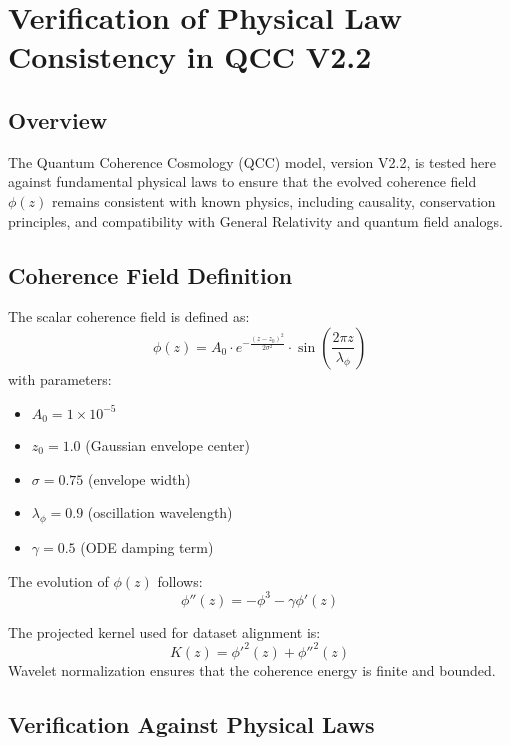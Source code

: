 
\section{Verification of Physical Law Consistency in QCC V2.2}

\subsection{Overview}

The Quantum Coherence Cosmology (QCC) model, version V2.2, is tested here against fundamental physical laws to ensure that the evolved coherence field $\phi(z)$ remains consistent with known physics, including causality, conservation principles, and compatibility with General Relativity and quantum field analogs.

\subsection{Coherence Field Definition}

The scalar coherence field is defined as:
\begin{equation}
\phi(z) = A_0 \cdot e^{-\frac{(z - z_0)^2}{2\sigma^2}} \cdot \sin\left(\frac{2\pi z}{\lambda_\phi}\right)
\end{equation}
with parameters:
\begin{itemize}
  \item $A_0 = 1 \times 10^{-5}$
  \item $z_0 = 1.0$ (Gaussian envelope center)
  \item $\sigma = 0.75$ (envelope width)
  \item $\lambda_\phi = 0.9$ (oscillation wavelength)
  \item $\gamma = 0.5$ (ODE damping term)
\end{itemize}

The evolution of $\phi(z)$ follows:
\begin{equation}
\phi''(z) = -\phi^3 - \gamma \phi'(z)
\end{equation}

The projected kernel used for dataset alignment is:
\begin{equation}
K(z) = \phi'^2(z) + \phi''^2(z)
\end{equation}
Wavelet normalization ensures that the coherence energy is finite and bounded.

\subsection{Verification Against Physical Laws}

